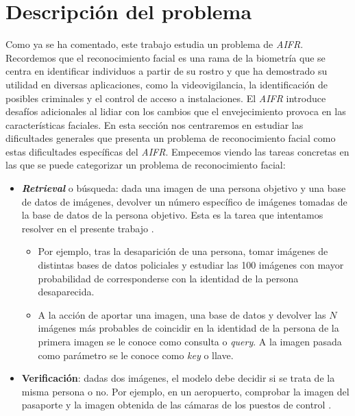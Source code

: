 \section{Descripción del problema} \label{ich:descrp_problema}

Como ya se ha comentado, este trabajo estudia un problema de \textit{AIFR}. Recordemos que el reconocimiento facial es una rama de la biometría que se centra en identificar individuos a partir de su rostro y que ha demostrado su utilidad en diversas aplicaciones, como la videovigilancia, la identificación de posibles criminales y el control de acceso a instalaciones. El \textit{AIFR} introduce desafíos adicionales al lidiar con los cambios que el envejecimiento provoca en las características faciales. En esta sección nos centraremos en estudiar las dificultades generales que presenta un problema de reconocimiento facial como estas dificultades específicas del \textit{AIFR}. Empecemos viendo las tareas concretas en las que se puede categorizar un problema de reconocimiento facial:

\begin{itemize}
	\item \textbf{\textit{Retrieval}} o búsqueda: dada una imagen de una persona objetivo y una base de datos de imágenes, devolver un número específico de imágenes tomadas de la base de datos de la persona objetivo. Esta es la tarea que intentamos resolver en el presente trabajo \footnotemark.

	      \begin{itemize}
		      \item Por ejemplo, tras la desaparición de una persona, tomar imágenes de distintas bases de datos policiales y estudiar las 100 imágenes con mayor probabilidad de corresponderse con la identidad de la persona desaparecida.
		      \item A la acción de aportar una imagen, una base de datos y devolver las $N$ imágenes más probables de coincidir en la identidad de la persona de la primera imagen se le conoce como consulta o \textit{query}. A la imagen pasada como parámetro se le conoce como \textit{key} o llave.
	      \end{itemize}

	\item \textbf{Verificación}: dadas dos imágenes, el modelo debe decidir si se trata de la misma persona o no. Por ejemplo, en un aeropuerto, comprobar la imagen del pasaporte y la imagen obtenida de las cámaras de los puestos de control \cite{informatica:docface}.
\end{itemize}

